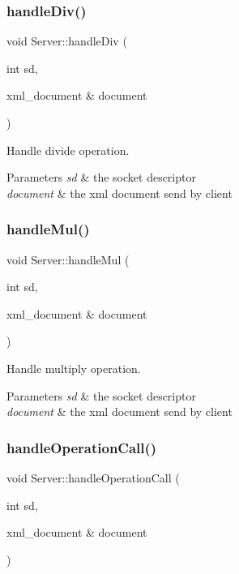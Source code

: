\subsubsection{\texorpdfstring{handle\+Div()}{handleDiv()}}
{\footnotesize\ttfamily void Server\+::handle\+Div (\begin{DoxyParamCaption}\item[{int}]{sd,  }\item[{xml\+\_\+document \&}]{document }\end{DoxyParamCaption})\hspace{0.3cm}{\ttfamily [private]}}

Handle divide operation. 
\begin{DoxyParams}{Parameters}
{\em sd} & the socket descriptor \\
\hline
{\em document} & the xml document send by client \\
\hline
\end{DoxyParams}
\mbox{\label{classServer_aea8043ace02861260e3cc5b9f2cb5e67}} 
\subsubsection{\texorpdfstring{handle\+Mul()}{handleMul()}}
{\footnotesize\ttfamily void Server\+::handle\+Mul (\begin{DoxyParamCaption}\item[{int}]{sd,  }\item[{xml\+\_\+document \&}]{document }\end{DoxyParamCaption})\hspace{0.3cm}{\ttfamily [private]}}

Handle multiply operation. 
\begin{DoxyParams}{Parameters}
{\em sd} & the socket descriptor \\
\hline
{\em document} & the xml document send by client \\
\hline
\end{DoxyParams}
\mbox{\label{classServer_ac7681c928d92fa6348356cb7427c3903}} 
\subsubsection{\texorpdfstring{handle\+Operation\+Call()}{handleOperationCall()}}
{\footnotesize\ttfamily void Server\+::handle\+Operation\+Call (\begin{DoxyParamCaption}\item[{int}]{sd,  }\item[{xml\+\_\+document \&}]{document }\end{DoxyParamCaption})\hspace{0.3cm}{\ttfamily [private]}}

